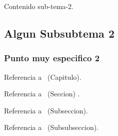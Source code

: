 Contenido sub-tema-2.

\subsection{Algun Subsubtema 2}\label{lbl-subsubtemados}

\subsubsection{Punto muy especifico 2}\label{lbl-profundodos}

Referencia a \temauno\ (Capitulo).

Referencia a \subtemauno\ (Seccion) .

Referencia a \subsubtemauno\ (Subseccion).

Referencia a \profundouno\ (Subsubseccion).
